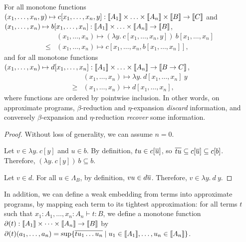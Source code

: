 \begin{proposition} \label{prop:intervals-weak-model-lambda} For all monotone functions $(x_1, \ldots, x_n, y) \mapsto c[x_1, \ldots, x_n, y] : \llbracket A_1 \rrbracket \times \ldots \times \llbracket A_n \rrbracket \times  \llbracket B \rrbracket \to \llbracket C \rrbracket$ and $(x_1, \ldots, x_n) \mapsto b[x_1, \ldots, x_n] : \llbracket A_1 \rrbracket \times \ldots \times \llbracket A_n \rrbracket \to \llbracket B \rrbracket$, $$\begin{array}{ll} & (x_1, \ldots, x_n) \mapsto (\lambda y.~  c[x_1, \ldots, x_n, y])~ b[x_1, \ldots, x_n] \\ \leq & (x_1, \ldots, x_n) \mapsto c[x_1, \ldots, x_n, b[x_1, \ldots, x_n]]\text{,}\end{array}$$
and for all monotone functions $(x_1, \ldots, x_n) \mapsto d[x_1, \ldots, x_n] : \llbracket A_1 \rrbracket \times \ldots \times \llbracket A_n \rrbracket \to  \llbracket B \to C \rrbracket$,
$$\begin{array}{ll} & (x_1, \ldots, x_n) \mapsto \lambda y.~  d[x_1, \ldots, x_n]~ y \\ \geq & (x_1, \ldots, x_n) \mapsto d[x_1, \ldots, x_n]\text{,}\end{array}$$
where functions are ordered by pointwise inclusion.  In other words, on approximate programs, $\beta$-reduction and $\eta$-expansion \emph{discard} information, and conversely $\beta$-expansion and $\eta$-reduction \emph{recover} some information.
\end{proposition}

\begin{proof} Without loss of generality, we can assume $n=0$.

Let $v \in \lambda y.~ c[y]$ and $u \in b$. By definition, $tu \in c[\overline{u}]$, so $\overline{tu} \subseteq c[\overline{u}] \subseteq c[b]$. Therefore, $(\lambda y.~ c[y])~ b \subseteq b$.

Let $v \in d$. For all $u \in \Lambda_B$, by definition, $vu \in d\overline{u}$. Therefore, $v \in \lambda y.~ d~ y$.
\end{proof}

In addition, we can define a weak embedding from terms into approximate programs, by mapping each term to its tightest approximation: for all terms $t$ such that $x_{1}:A_{1},\dots,x_{n}:A_{n}\vdash t:B$, we define a monotone function $\partial(t):\llbracket A_{1} \rrbracket\times \dots \times \llbracket A_{n} \rrbracket \to \llbracket B \rrbracket$ by $\partial(t)(a_1, \ldots, a_n) = \sup \{ \overline{t u_1 \ldots u_n} \mid u_1 \in \llbracket A_1 \rrbracket, \ldots, u_n \in \llbracket A_n \rrbracket \}$. 

